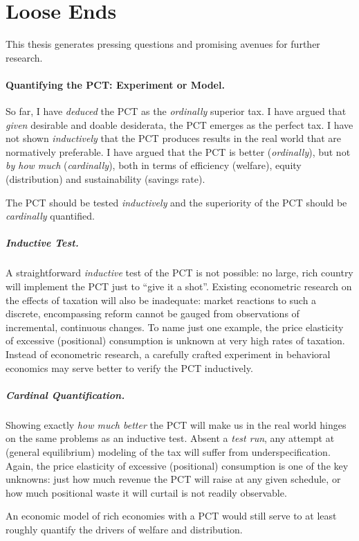 \section{Loose Ends} \label{sec:LooseEnds} This thesis generates pressing questions and promising avenues for further research.

\paragraph{Quantifying the PCT: Experiment or Model.} So far, I have \emph{deduced} the PCT as the \emph{ordinally} superior tax. I have argued that \emph{given} desirable and doable desiderata, the PCT emerges as the perfect tax. I have not shown \emph{inductively} that the PCT produces results in the real world that are normatively preferable. I have argued that the PCT is better (\emph{ordinally}), but not \emph{by how much} (\emph{cardinally}), both in terms of efficiency (welfare), equity (distribution) and sustainability (savings rate).
	
	The PCT should be tested \emph{inductively} and the superiority of the PCT should be \emph{cardinally} quantified.
	
\subparagraph{Inductive Test.} A straightforward \emph{inductive} test of the PCT is not possible: no large, rich country will implement the PCT just to ``give it a shot''. Existing econometric research on the effects of taxation will also be inadequate: market reactions to such a discrete, encompassing reform cannot be gauged from observations of incremental, continuous changes. To name just one example, the price elasticity of excessive (positional) consumption is unknown at very high rates of taxation. Instead of econometric research, a carefully crafted experiment in behavioral economics may serve better to verify the PCT inductively.

\subparagraph{Cardinal Quantification.} Showing exactly \emph{how much better} the PCT will make us in the real world hinges on the same problems as an inductive test. Absent a \emph{test run}, any attempt at (general equilibrium) modeling of the tax will suffer from underspecification. Again, the price elasticity of excessive (positional) consumption is one of the key unknowns: just how much revenue the PCT will raise at any given schedule, or how much positional waste it will curtail is not readily observable. 

An economic model of rich economies with a PCT would still serve to at least roughly quantify the drivers of welfare and distribution.

